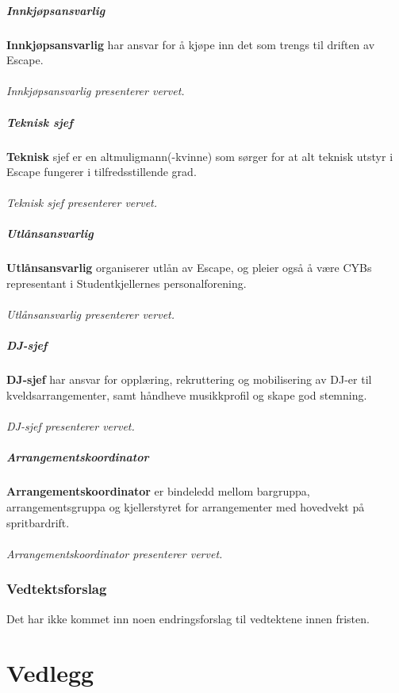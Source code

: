 \documentclass[10pt,norsk,a4paper]{article}
\begin{document}
\begin{multicols}{2}
\subsubsection{Innkjøpsansvarlig}
\textbf{Innkjøpsansvarlig} har ansvar for å kjøpe inn det som trengs til
driften av Escape.
\\\\\textit{Innkjøpsansvarlig presenterer vervet.}

\subsubsection{Teknisk sjef}
\textbf{Teknisk} sjef er en altmuligmann(-kvinne) som sørger for at alt
teknisk utstyr i Escape fungerer i tilfredsstillende grad.
\\\\\textit{Teknisk sjef presenterer vervet.}

\subsubsection{Utlånsansvarlig}
\textbf{Utlånsansvarlig} organiserer utlån av Escape, og pleier også å
være CYBs representant i Studentkjellernes personalforening.
\\\\\textit{Utlånsansvarlig presenterer vervet.}

\subsubsection{DJ-sjef}
\textbf{DJ-sjef} har ansvar for opplæring, rekruttering og mobilisering
av DJ-er til kveldsarrangementer, samt håndheve musikkprofil og skape
god stemning.
\\\\\textit{DJ-sjef presenterer vervet.}

\subsubsection{Arrangementskoordinator}
\textbf{Arrangementskoordinator} er bindeledd mellom bargruppa,
arrangementsgruppa og kjellerstyret for arrangementer med hovedvekt på
spritbardrift.
\\\\\textit{Arrangementskoordinator presenterer vervet.}
\end{multicols}

\section{Vedtektsforslag}
Det har ikke kommet inn noen endringsforslag til vedtektene innen fristen.

\part*{Vedlegg}\label{lastpage}


\end{document}
